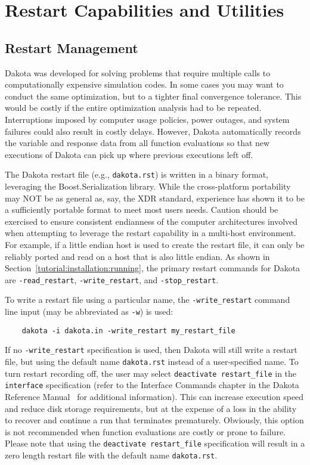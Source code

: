 \chapter{Restart Capabilities and Utilities}\label{restart}

\section{Restart Management}\label{restart:management}

Dakota was developed for solving problems that require multiple calls
to computationally expensive simulation codes. In some cases you may
want to conduct the same optimization, but to a tighter final
convergence tolerance. This would be costly if the entire optimization
analysis had to be repeated. Interruptions imposed by computer usage
policies, power outages, and system failures could also result in
costly delays. However, Dakota automatically records the variable and
response data from all function evaluations so that new executions of
Dakota can pick up where previous executions left off.

The Dakota restart file (e.g., \texttt{dakota.rst}) is written in a
binary format, leveraging the Boost.Serialization library. While the
cross-platform portability may NOT be as general as, say, the XDR standard,
experience has shown it to be a sufficiently portable format to meet
most users needs.  Caution should be exercised to ensure consistent
endianness of the computer architectures involved when attempting to leverage
the restart capability in a multi-host environment.  For example, if a little
endian host is used to create the restart file, it can only be reliably ported
and read on a host that is also little endian.  As shown in
Section~\ref{tutorial:installation:running},
the primary restart commands for Dakota are
\texttt{-read\_restart}, \texttt{-write\_restart}, and \texttt{-stop\_restart}.

To write a restart file using a particular name, the
\texttt{-write\_restart} command line input (may be abbreviated as
\texttt{-w}) is used:
\begin{small}
\begin{verbatim}
    dakota -i dakota.in -write_restart my_restart_file
\end{verbatim}
\end{small}
If no \texttt{-write\_restart} specification is used, then Dakota will
still write a restart file, but using the default name
\texttt{dakota.rst} instead of a user-specified name.  To turn restart
recording off, the user may select \texttt{deactivate restart\_file}
in the \texttt{interface} specification (refer to the Interface
Commands chapter in the Dakota Reference Manual~\cite{RefMan} for
additional information).  This can increase execution speed and reduce
disk storage requirements, but at the expense of a loss in the ability
to recover and continue a run that terminates prematurely.  Obviously,
this option is not recommended when function evaluations are costly or
prone to failure. Please note that using the \texttt{deactivate restart\_file}
specification will result in a zero length restart file
with the default name \texttt{dakota.rst}.

